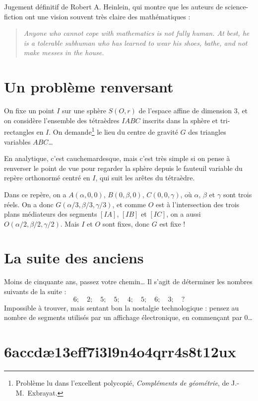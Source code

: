 \documentclass[a4paper,11pt]{article}
\begin{document}
Jugement définitif de Robert A. Heinlein, qui montre que les auteurs de
science-fiction ont une vision souvent très claire des mathématiques :
\begin{quotation}\itshape\noindent
  Anyone who cannot cope with mathematics is not fully human. At best, he
  is a tolerable subhuman who has learned to wear his shoes, bathe, and
  not make messes in the house.
\end{quotation}

\section{Un problème renversant}

On fixe un point $I$ sur une sphère $S(O,r)$ de l'espace affine de dimension
$3$, et on considère l'ensemble des tétraèdres $IABC$ inscrits dans la sphère
et tri-rectangles en $I$. On demande\footnote{
  Problème lu dans l'excellent polycopié,
  {\slshape Compléments de géométrie}, de J.-M.~Exbrayat.}
le lieu du centre de gravité $G$ des triangles variables $ABC$\dots

\smallskip
En analytique, c'est cauchemardesque, mais c'est très simple si on pense
à renverser le point de vue pour regarder la sphère depuis le fauteuil
variable du repère orthonormé centré en $I$, qui suit les arêtes du
tétraèdre.

Dans ce repère, on a $A(\alpha,0,0)$, $B(0,\beta,0)$, $C(0,0,\gamma)$,
où $\alpha$, $\beta$ et $\gamma$ sont trois réels.
On a donc $G(\alpha/3, \beta/3, \gamma/3)$, et comme $O$ est à
l'intersection des trois plans médiateurs des segments $[IA]$, $[IB]$ et
$[IC]$, on a aussi $O(\alpha/2, \beta/2, \gamma/2)$.
Mais $I$ et $O$ sont fixes, donc $G$ est fixe !

\section{La suite des anciens}

Moins de cinquante ans, passez votre chemin\dots{}
Il s'agit de déterminer les nombres suivants de la suite :
\[ 6 ;\quad 2;\quad 5;\quad 5; \quad4;\quad 5;\quad 6; \quad 3;\quad ? \]
Impossible à trouver, mais sentant bon la nostalgie technologique :
pensez au nombre de segments utilisés par un affichage électronique,
en commençant par $0$\dots

\section{6accdæ13eff7i3l9n4o4qrr4s8t12ux}
\end{document}
